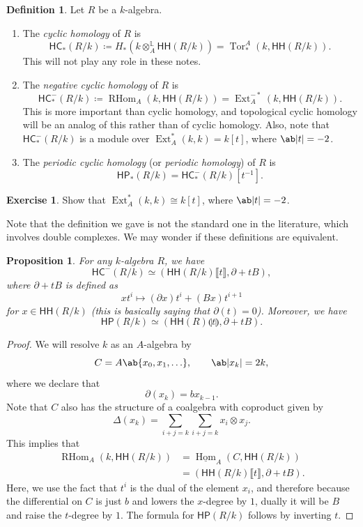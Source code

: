 \documentclass[10pt, oneside]{memoir}
\newtheorem{prop}[thm]{Proposition}
\theoremstyle{definition}
\newtheorem{defn}[thm]{Definition}
\newtheorem{exer}[thm]{Exercise}
\theoremstyle{remark}
\theoremstyle{plain}
\theoremstyle{definition}
\theoremstyle{remark}
\renewcommand{\L}{\mathbb{L}}
\newcommand{\ms}[1]{\mathsf{#1}}
\newcommand{\ul}[1]{\underline{#1}}
\newcommand{\1}{\mathbf{1}}
\newcommand{\2}{\mathbf{2}}
\newcommand{\3}{\mathbf{3}}
\newcommand{\ps}[1]{\llbracket #1 \rrbracket}
\newcommand{\ls}[1]{\llparenthesis #1 \rrparenthesis}
\newcommand{\HC}{\ms{HC}}
\newcommand{\HH}{\ms{HH}}
\newcommand{\HP}{\ms{HP}}
\DeclareMathOperator{\Tor}{Tor}
\DeclareMathOperator{\Hom}{Hom}
\DeclareMathOperator{\RHom}{RHom}
\DeclareMathOperator{\Ext}{Ext}
\begin{document}
\begin{defn}
    Let \(R \) be a \(k \)-algebra.
    \begin{enumerate}
        \item The \textit{cyclic homology} of \(R \) is
        \[ \HC_*(R/k) \coloneqq H_*(k \otimes_A^{\L} \HH(R/k)) = \Tor_*^A(k, \HH(R/k)). \]
        This will not play any role in these notes.
        \item The \textit{negative cyclic homology} of \(R \) is
        \[ \HC_*^-(R/k) \coloneqq \RHom_A(k, \HH(R/k)) = \Ext_A^{-*}(k, \HH(R/k)). \]
        This is more important than cyclic homology, and topological cyclic homology will be an analog of this rather than of cyclic homology. Also, note that \(\HC_*^-(R/k) \) is a module over \(\Ext_A^{*}(k,k) = k[t] \), where \(\ab|t| = -2 \).
        \item The \textit{periodic cyclic homology} (or \textit{periodic homology}) of \(R \) is
        \[ \HP_*(R/k) = \HC_*^-(R/k) [t^{-1}]. \]
    \end{enumerate}
\end{defn}

\begin{exer}
    Show that \(\Ext_A^*(k,k) \cong k[t] \), where \(\ab|t| = -2 \).
\end{exer}

Note that the definition we gave is not the standard one in the literature, which involves double complexes. We may wonder if these definitions are equivalent.

\begin{prop}
    For any \(k \)-algebra \(R \), we have
    \[ \HC^-(R/k) \simeq (\HH(R/k)\ps{t}, \partial + tB), \]
    where \(\partial + tB \) is defined as
    \[ xt^i \mapsto (\partial x) t^i + (Bx) t^{i+1} \]
    for \(x \in \HH(R/k) \) (this is basically saying that \(\partial(t) = 0 \)). Moreover, we have
    \[ \HP(R/k) \simeq (\HH(R)\ls{t}, \partial + tB). \]
\end{prop}

\begin{proof}
    We will resolve \(k \) as an \(A \)-algebra by
    \[ C = A\ab\{ x_0, x_1, \ldots\}, \qquad \ab|x_k| = 2k, \]
    where we declare that
    \[ \partial(x_k) = b x_{k-1}. \]
    Note that \(C \) also has the structure of a coalgebra with coproduct given by
    \[ \Delta(x_k) = \sum_{i+j = k} \sum_{i+j=k} x_i \otimes x_j. \]
    This implies that
    \begin{align*}
        \RHom_A(k, \HH(R/k)) &= \ul{\Hom}_A(C, \HH(R/k)) \\
        &= (\HH(R/k)\ps{t}, \partial + tB).
    \end{align*}
    Here, we use the fact that \(t^i \) is the dual of the element \(x_i \), and therefore because the differential on \(C \) is just \(b \) and lowers the \(x \)-degree by \(1 \), dually it will be \(B \) and raise the \(t \)-degree by \(1 \). The formula for \(\HP(R/k) \) follows by inverting \(t \).
\end{proof}
\end{document}
